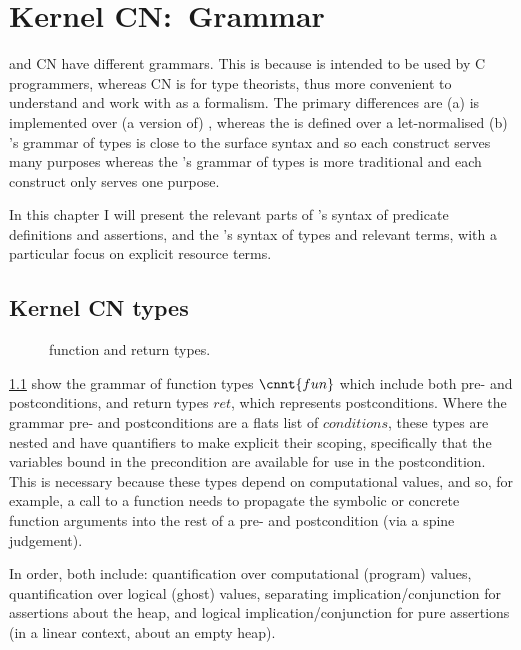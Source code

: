\chapter{Kernel CN:\ Grammar}%
\label{chap:kernel-grammar}

\margintoc%

 and  CN have different grammars. This is because  is
intended to be used by C programmers, whereas  CN is for type
theorists, thus more convenient to understand and work with as a formalism. The
primary differences are (a)  is implemented over (a version of)
, whereas the  is defined over a let-normalised
 (b) 's grammar of types is close to the surface syntax and
so each construct serves many purposes whereas the 's grammar of types
is more traditional and each construct only serves one purpose.

In this chapter I will present the relevant parts of 's syntax of
predicate definitions and assertions, and the 's syntax of types and
relevant terms, with a particular focus on explicit resource terms.

\section{Kernel CN types}

\begin{figure}
    \grammartabularSTY{
        \cnfon{}\cninterrule{}
        \cnret{}\cninterrule{}
    }
    \caption{ function and return types.}\label{fig:kernel-fun-ret}
\end{figure}

\cref{fig:kernel-fun-ret} show the grammar of function types $\cnnt{fun}$ which
include both pre- and postconditions, and return types ${ret}$, which
represents postconditions. Where the  grammar pre- and postconditions
are a flats list of ${conditions}$, these types are nested and have quantifiers
to make explicit their scoping, specifically that the variables bound in the
precondition are available for use in the postcondition. This is necessary
because these types depend on computational values, and so, for example, a call
to a function needs to propagate the symbolic or concrete function arguments
into the rest of a pre- and postcondition (via a spine judgement).

In order, both include: quantification over computational (program) values,
quantification over logical (ghost) values, separating implication/conjunction
for assertions about the heap, and logical implication/conjunction for pure
assertions (in a linear context, about an empty heap).

